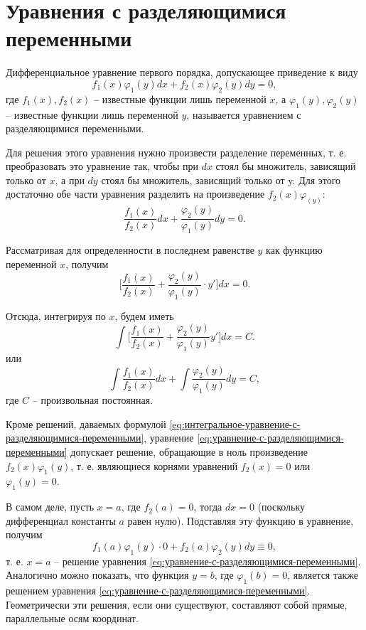 \documentclass[a5paper, 11pt]{extbook}
\theoremstyle{definition}
\theoremstyle{definition}
\theoremstyle{definition}
\begin{document}
\section{Уравнения с разделяющимися переменными}

Дифференциальное уравнение первого порядка, допускающее приведение к виду
\begin{equation}
    \label{eq:уравнение-с-разделяющимися-переменными}
    f_1(x) \varphi_1(y) dx + f_2(x) \varphi_2(y) dy = 0,
\end{equation}
где \(f_1(x), f_2(x)\) -- известные функции лишь переменной \(x\), а \(\varphi_1(y), \varphi_2(y)\) -- известные функции лишь переменной \(y\), называется уравнением с разделяющимися переменными.

Для решения этого уравнения нужно произвести разделение переменных, т. е. преобразовать это уравнение так, чтобы при \(dx\) стоял бы множитель, зависящий только от \(x\), а при \(dy\) стоял бы множитель, зависящий только от y. Для этого достаточно обе части уравнения разделить на произведение \(f_2(x) \varphi_(y)\):
\[
    \frac{f_1(x)}{f_2(x)} dx + \frac{\varphi_2(y)}{\varphi_1(y)} dy = 0.
\]

Рассматривая для определенности в последнем равенстве \(y\) как функцию переменной \(x\), получим
\[
    \Big[ \frac{f_1(x)}{f_2(x)} + \frac{\varphi_2(y)}{\varphi_1(y)} \cdot y' \Big] dx = 0.
\]

Отсюда, интегрируя по \(x\), будем иметь
\[
    \int \Big[ \frac{f_1(x)}{f_2(x)} + \frac{\varphi_2(y)}{\varphi_1(y)}y' \Big] dx = C.
\]
или
\begin{equation}
    \label{eq:интегральное-уравнение-с-разделяющимися-переменными}
    \int \frac{f_1(x)}{f_2(x)} dx + \int \frac{\varphi_2(y)}{\varphi_1(y)} dy = C,
\end{equation}
где \(C\) -- произвольная постоянная.

Кроме решений, даваемых формулой \eqref{eq:интегральное-уравнение-с-разделяющимися-переменными}, уравнение \eqref{eq:уравнение-с-разделяющимися-переменными} допускает решение, обращающие в ноль произведение \(f_2(x) \varphi_1(y)\), т. е. являющиеся корнями уравнений \(f_2(x) = 0\) или \(\varphi_1(y) = 0\).

В самом деле, пусть \(x = a\), где \(f_2(a) = 0\), тогда \(dx = 0\) (поскольку дифференциал константы \(a\) равен нулю). Подставляя эту функцию в уравнение, получим
\[
    f_1(a) \varphi_1(y) \cdot 0 + f_2(a) \varphi_2(y) dy \equiv 0,
\]
т. е. \(x = a\) -- решение уравнения \eqref{eq:уравнение-с-разделяющимися-переменными}. Аналогично можно показать, что функция \(y = b\), где \(\varphi_1(b) = 0\), является также решением уравнения \eqref{eq:уравнение-с-разделяющимися-переменными}. Геометрически эти решения, если они существуют, составляют собой прямые, параллельные осям координат.
\end{document}
